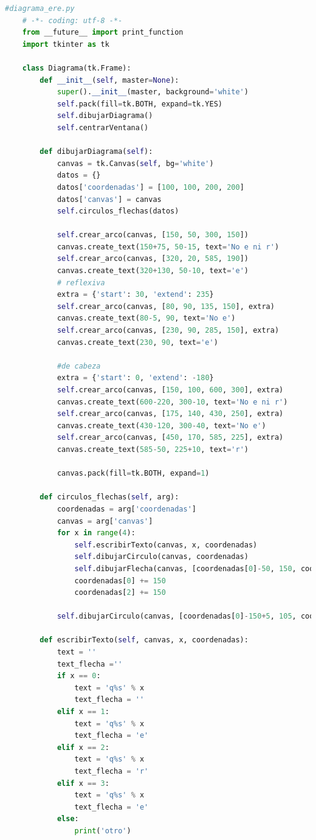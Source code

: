 	\begin{lstlisting}[language=Python]
	#diagrama_ere.py
	# -*- coding: utf-8 -*-
	from __future__ import print_function
	import tkinter as tk
	
	class Diagrama(tk.Frame):
		def __init__(self, master=None):
			super().__init__(master, background='white')
			self.pack(fill=tk.BOTH, expand=tk.YES)
			self.dibujarDiagrama()
			self.centrarVentana()
	
		def dibujarDiagrama(self):
			canvas = tk.Canvas(self, bg='white')
			datos = {}
			datos['coordenadas'] = [100, 100, 200, 200]
			datos['canvas'] = canvas
			self.circulos_flechas(datos)
			
			self.crear_arco(canvas, [150, 50, 300, 150])
			canvas.create_text(150+75, 50-15, text='No e ni r')
			self.crear_arco(canvas, [320, 20, 585, 190])
			canvas.create_text(320+130, 50-10, text='e')
			# reflexiva
			extra = {'start': 30, 'extend': 235}
			self.crear_arco(canvas, [80, 90, 135, 150], extra)
			canvas.create_text(80-5, 90, text='No e')
			self.crear_arco(canvas, [230, 90, 285, 150], extra)
			canvas.create_text(230, 90, text='e')
			
			#de cabeza
			extra = {'start': 0, 'extend': -180}
			self.crear_arco(canvas, [150, 100, 600, 300], extra)
			canvas.create_text(600-220, 300-10, text='No e ni r')
			self.crear_arco(canvas, [175, 140, 430, 250], extra)
			canvas.create_text(430-120, 300-40, text='No e')
			self.crear_arco(canvas, [450, 170, 585, 225], extra)
			canvas.create_text(585-50, 225+10, text='r')
			
			canvas.pack(fill=tk.BOTH, expand=1)
		
		def circulos_flechas(self, arg):
			coordenadas = arg['coordenadas']
			canvas = arg['canvas']
			for x in range(4):
				self.escribirTexto(canvas, x, coordenadas)
				self.dibujarCirculo(canvas, coordenadas)
				self.dibujarFlecha(canvas, [coordenadas[0]-50, 150, coordenadas[2]-100, 150])
				coordenadas[0] += 150
				coordenadas[2] += 150
			
			self.dibujarCirculo(canvas, [coordenadas[0]-150+5, 105, coordenadas[2]-155, 195]) # circulo interior
		
		def escribirTexto(self, canvas, x, coordenadas):
			text = ''
			text_flecha =''
			if x == 0:
				text = 'q%s' % x
				text_flecha = ''
			elif x == 1:
				text = 'q%s' % x
				text_flecha = 'e'
			elif x == 2:
				text = 'q%s' % x
				text_flecha = 'r'
			elif x == 3:
				text = 'q%s' % x
				text_flecha = 'e'
			else:
				print('otro')
		

\end{lstlisting}
